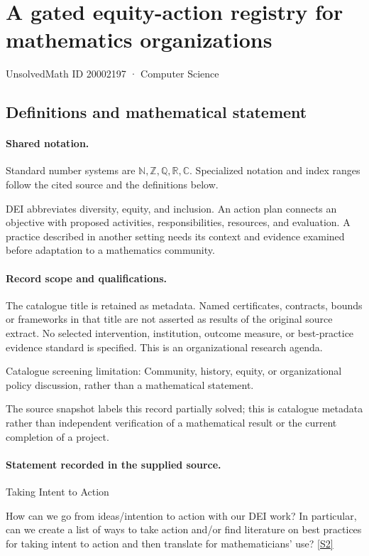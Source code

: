 \documentclass[11pt]{article}
\newcommand{\sref}[2]{\hyperlink{source:#1:#2}{[S#2]}}
\begin{document}
\setcounter{section}{20002196}
\section{A gated equity-action registry for mathematics organizations}\label{20002197}
{\small\sffamily UnsolvedMath ID 20002197 · Computer Science}
\subsection{Definitions and mathematical statement}

\paragraph{Shared notation.}Standard number systems are $\mathbb N,\mathbb Z,\mathbb Q,\mathbb R,\mathbb C$. Specialized notation and index ranges follow the cited source and the definitions below.


DEI abbreviates diversity, equity, and inclusion. An action plan connects an objective with proposed activities, responsibilities, resources, and evaluation. A practice described in another setting needs its context and evidence examined before adaptation to a mathematics community.
\paragraph{Record scope and qualifications.}
The catalogue title is retained as metadata. Named certificates, contracts, bounds or frameworks in that title are not asserted as results of the original source extract.
No selected intervention, institution, outcome measure, or best-practice evidence standard is specified. This is an organizational research agenda.

Catalogue screening limitation: Community, history, equity, or organizational policy discussion, rather than a mathematical statement.

The source snapshot labels this record partially solved; this is catalogue metadata rather than independent verification of a mathematical result or the current completion of a project.
\paragraph{Statement recorded in the supplied source.}
Taking Intent to Action

How can we go from ideas/intention to action with our DEI work? In particular, can we create a list of ways to take action and/or find literature on best practices for taking intent to action and then translate for mathematicians' use? \sref{20002197}{2}
\end{document}
